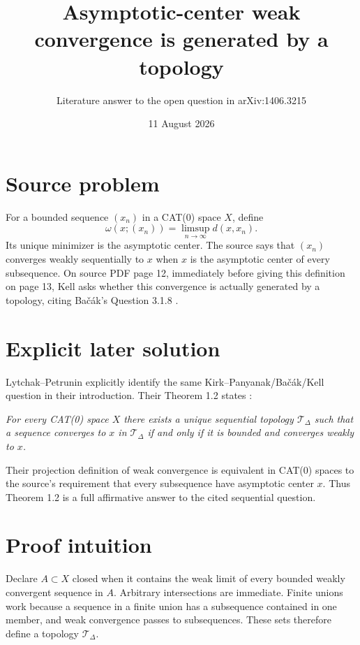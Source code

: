 \documentclass[11pt]{article}
\title{Asymptotic-center weak convergence is generated by a topology}
\author{Literature answer to the open question in arXiv:1406.3215}
\date{11 August 2026}
\begin{document}
\maketitle

\begin{center}
\end{center}

\section*{Source problem}
For a bounded sequence $(x_n)$ in a CAT(0) space $X$, define
\[
 \omega(x;(x_n))=\limsup_{n\to\infty}d(x,x_n).
\]
Its unique minimizer is the asymptotic center.  The source says that $(x_n)$ converges weakly sequentially to $x$ when $x$ is the asymptotic center of every subsequence.  On source PDF page 12, immediately before giving this definition on page 13, Kell asks whether this convergence is actually generated by a topology, citing Ba\v{c}\'ak's Question 3.1.8 \cite{Kell}.

\section*{Explicit later solution}
Lytchak--Petrunin explicitly identify the same Kirk--Panyanak/Ba\v{c}\'ak/Kell question in their introduction.  Their Theorem 1.2 states \cite{LP}:

\medskip
\noindent
\emph{For every CAT(0) space $X$ there exists a unique sequential topology $\mathcal T_\Delta$ such that a sequence converges to $x$ in $\mathcal T_\Delta$ if and only if it is bounded and converges weakly to $x$.}
\medskip

Their projection definition of weak convergence is equivalent in CAT(0) spaces to the source's requirement that every subsequence have asymptotic center $x$.  Thus Theorem 1.2 is a full affirmative answer to the cited sequential question.

\section*{Proof intuition}
Declare $A\subset X$ closed when it contains the weak limit of every bounded weakly convergent sequence in $A$.  Arbitrary intersections are immediate.  Finite unions work because a sequence in a finite union has a subsequence contained in one member, and weak convergence passes to subsequences.  These sets therefore define a topology $\mathcal T_\Delta$.
\end{document}
